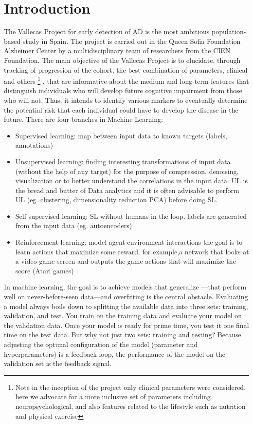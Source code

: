 \documentclass[12pt]{report}
\begin{document}
\section{Introduction}
The Vallecas Project for early detection of AD is the most ambitious population-based study in Spain. The project is carried out in the Queen Sofia Foundation Alzheimer Center by a multidisciplinary team of researchers from the CIEN Foundation. The main objective of the Vallecas Project is to elucidate, through tracking of progression of the cohort, the best combination of  parameters, clinical and others \footnote{Note in the inception of the project only clinical parameters were considered, here we advocate for a more inclusive set of parameters including neuropsychological, and also features related to the lifestyle such as nutrition and physical exercise} , that are informative about the medium and long-term features that distinguish individuals who will develop future cognitive impairment from those who will not. Thus, it intends to identify various markers to eventually determine the potential risk that each individual could have to develop the disease in the future.
There are four branches in Machine Learning:  
\begin{itemize}
\item Supervised learning: map between input data to known targets (labels, annotations) 
\item Unsupervised learning: finding interesting transformations of input data (without the help of any target) for the purpose of compression, denoising, visualization or to better understand the correlations in the input data. UL is the bread and butter of Data analytics and it is often advisable to perform UL (eg. clustering, dimensionality reduction PCA) before doing SL. 
\item Self supervised learning: SL without humans in the loop, labels are generated from the input data (eg. autoencoders)
\item Reinforcement learning: model agent-environment interactions the goal is to learn actions that maximize some reward. for example,a network that looks at a video game screen and outputs the game actions that will maximize the score (Atari games)
\end{itemize}
In machine learning, the goal is to achieve models that generalize —that perform well on never-before-seen data—and overfitting is the central obstacle. Evaluating a model always boils down to splitting the available data into three sets: training, validation, and test. You train on the training data and evaluate your model on the validation data. Once your model is ready for prime time, you test it one final time on the test data. 
But why not just two sets: training and testing? Because adjusting the optimal configuration of the model (parameter and hyperparameters) is a feedback loop, the performance of the model on the validation set is the feedback signal.
\end{document}
